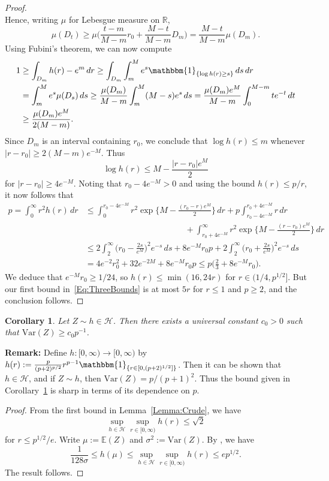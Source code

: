 \documentclass[12pt]{article}
\newtheorem{corollary}[theorem]{Corollary}
\begin{document}
\begin{proof}
\[\]
Hence, writing $\mu$ for Lebesgue measure on $\mathbb{R}$,
\[
\mu(D_t) \geq \mu\biggl(\frac{t-m}{M-m}r_0 + \frac{M-t}{M-m}D_m\biggr) = \frac{M-t}{M-m}\mu(D_m).
\]
Using Fubini's theorem, we can now compute
\begin{align*}
1 &\geq \int_{D_m} h(r) - e^m \, dr \geq \int_{D_m} \int_m^M e^s \mathbbm{1}_{\{\log h(r) \geq s\}} \, ds \, dr \\
&= \int_m^M e^s \mu(D_s) \, ds \geq \frac{\mu(D_m)}{M-m}\int_m^M (M-s)e^s \, ds = \frac{\mu(D_m)e^M}{M-m}\int_0^{M-m} te^{-t} \, dt \\
&\geq \frac{\mu(D_m)e^M}{2(M-m)}.
\end{align*}
Since $D_m$ is an interval containing $r_0$, we conclude that $\log h(r) \leq m$ whenever $|r-r_0| \geq 2(M-m)e^{-M}$.  Thus
\[
\log h(r) \leq M - \frac{|r-r_0|e^M}{2}
\]
for $|r-r_0| \geq 4e^{-M}$.  Noting that $r_0 - 4e^{-M} > 0$ and using the bound $h(r) \leq p/r$, it now follows that
\begin{align*}
p = \int_0^\infty r^2h(r) \, dr &\leq \int_0^{r_0 - 4e^{-M}} r^2 \exp\biggl\{M - \frac{(r_0-r)e^M}{2}\biggr\} \, dr + p\int_{r_0 - 4e^{-M}}^{r_0 + 4e^{-M}} r \, dr \\
&\hspace{5cm}+ \int_{r_0 + 4e^{-M}}^\infty r^2 \exp\biggl\{M - \frac{(r-r_0)e^M}{2}\biggr\} \, dr \\
&\leq 2\int_2^\infty \biggl(r_0 - \frac{2s}{e^M}\biggr)^2 e^{-s} \, ds + 8e^{-M}r_0p + 2\int_2^\infty \biggl(r_0 + \frac{2s}{e^M}\biggr)^2 e^{-s} \, ds \\
&= 4e^{-2}r_0^2 + 32e^{-2M} + 8e^{-M}r_0p \leq p\biggl(\frac{2}{3} + 8e^{-M}r_0\biggr).
\end{align*}
We deduce that $e^{-M}r_0 \geq 1/24$, so $h(r) \leq \min(16,24r)$ for $r \in (1/4,p^{1/2}]$.  But our first bound in~\eqref{Eq:ThreeBounds} is at most $5r$ for $r \leq 1$ and $p \geq 2$, and the conclusion follows.
\end{proof}
\begin{corollary}
\label{Cor:VarLowerBound}
Let $Z \sim h \in \mathcal{H}$.  Then there exists a universal constant $c_0 > 0$ such that $\mathrm{Var}(Z) \geq c_0p^{-1}$.
\end{corollary}
\textbf{Remark:} Define $h:[0,\infty) \rightarrow [0,\infty)$ by $h(r) := \frac{p}{(p+2)^{p/2}}r^{p-1}\mathbbm{1}_{\{r \in [0,(p+2)^{1/2}]\}}$.  Then it can be shown that $h \in \mathcal{H}$, and if $Z \sim h$, then $\mathrm{Var}(Z) = p/(p+1)^2$.  Thus the bound given in Corollary~\ref{Cor:VarLowerBound} is sharp in terms of its dependence on $p$.
\begin{proof}
From the first bound in Lemma~\ref{Lemma:Crude}, we have 
\[
\sup_{h \in \mathcal{H}} \sup_{r \in [0,\infty)} h(r) \leq \sqrt{2}
\]
for $r \leq p^{1/2}/e$.  Write $\mu := \mathbb{E}(Z)$ and $\sigma^2 := \mathrm{Var}(Z)$.  By \citet[][Theorem~5.14(d)]{lovasz2007geometry}, we have
\[
\frac{1}{128\sigma} \leq h(\mu) \leq \sup_{h \in \mathcal{H}} \sup_{r \in [0,\infty)} h(r) \leq ep^{1/2}.
\]
The result follows.
\end{proof}
\end{document}
